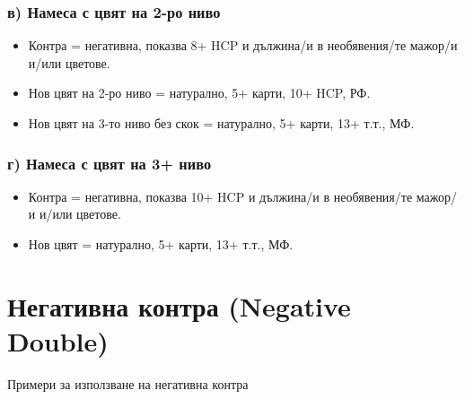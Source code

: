 \documentclass[10pt,a5paper]{extarticle}
\begin{document}
\subsubsection*{в) Намеса с цвят на 2-ро ниво}
\begin{itemize}
    \item[] Контра = негативна, показва 8+ HCP и дължина/и в необявения/те мажор/и и/или цветове.
    \item[] Нов цвят на 2-ро ниво = натурално, 5+ карти, 10+ HCP, РФ.
    \item[] Нов цвят на 3-то ниво без скок = натурално, 5+ карти, 13+ т.т., МФ.
\end{itemize}

\subsubsection*{г) Намеса с цвят на 3+ ниво}
\begin{itemize}
    \item[] Контра = негативна, показва 10+ HCP и дължина/и в необявения/те мажор/и и/или цветове.
    \item[] Нов цвят = натурално, 5+ карти, 13+ т.т., МФ.
\end{itemize}

\bigskip
{}



\section*{Негативна контра (Negative Double)}

Примери за използване на негативна контра
\end{document}
